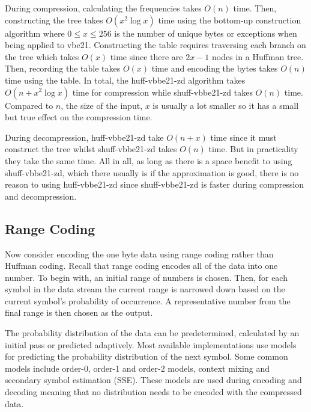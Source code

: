 During compression, calculating the frequencies takes $O(n)$ time. Then,
constructing the tree takes $O(x^2\log x)$ time using the bottom-up construction
algorithm where $0\le x \le 256$ is the number of unique bytes or exceptions
when being applied to vbe21. Constructing the table requires traversing each
branch on the tree which takes $O(x)$ time since there are $2x-1$ nodes in a
Huffman tree. Then, recording the table takes $O(x)$ time and encoding the bytes
takes $O(n)$ time using the table. In total, the huff-vbbe21-zd algorithm takes
$O(n + x^2\log x)$ time for compression while shuff-vbbe21-zd takes $O(n)$ time. Compared
to $n$, the size of the input, $x$ is usually a lot smaller so it has a small
but true effect on the compression time.

During decompression, huff-vbbe21-zd take $O(n + x)$ time since it must construct the tree
whilst shuff-vbbe21-zd takes $O(n)$ time. But in practicality they take the same time. All
in all, as long as there is a space benefit to using shuff-vbbe21-zd, which there usually
is if the approximation is good, there is no reason to using huff-vbbe21-zd since shuff-vbbe21-zd is
faster during compression and decompression.



\subsection{Range Coding}

Now consider encoding the one byte data using range coding rather than Huffman
coding. Recall that range coding encodes all of the data into one number. To
begin with, an initial range of numbers is chosen. Then, for each symbol in the
data stream the current range is narrowed down based on the current symbol's
probability of occurrence. A representative number from the final range is then
chosen as the output.

The probability distribution of the data can be predetermined, calculated by an
initial pass or predicted adaptively. Most available implementations use models
for predicting the probability distribution of the next symbol.
Some common models include order-0, order-1 and order-2 models, context mixing and
secondary symbol estimation (SSE). These models are used during encoding and
decoding meaning that no distribution needs to be encoded with the compressed
data.

